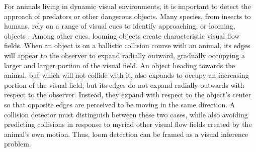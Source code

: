 \documentclass[pdftex,9pt,lineno]{elife}
\begin{document}



For animals living in dynamic visual environments, it is important to detect the approach of predators or other dangerous objects. Many species, from insects to humans, rely on a range of visual cues to identify approaching, or looming, objects \citep{regan1978looming,sun1998computation,gabbiani1999computation,card2008visually,munch2009approach,temizer2015visual}. Among other cues, looming objects create characteristic visual flow fields. When an object is on a ballistic collision course with an animal, its edges will appear to the observer to expand radially outward, gradually occupying a larger and larger portion of the visual field. An object heading towards the animal, but which will not collide with it, also expands to occupy an increasing portion of the visual field, but its edges do not expand radially outwards with respect to the observer. Instead, they expand with respect to the object's center so that opposite edges are perceived to be moving in the same direction. A collision detector must distinguish between these two cases, while also avoiding predicting collisions in response to myriad other visual flow fields created by the animal's own motion. Thus, loom detection can be framed as a visual inference problem.
\end{document}
